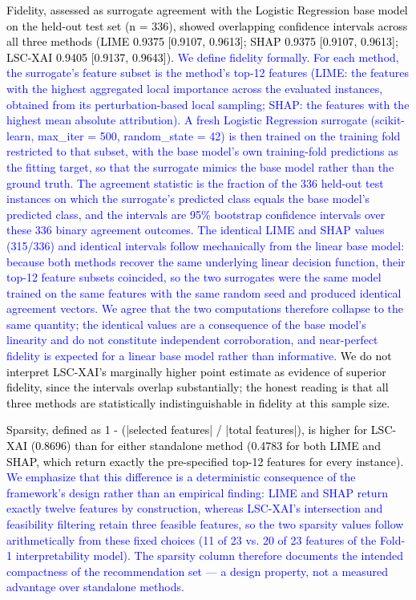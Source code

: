 \documentclass[a4paper,fleqn]{cas-sc}
\begin{document}
\textcolor{black}{Fidelity, assessed as surrogate agreement with the Logistic Regression base model on the held-out test set (n = 336), showed overlapping confidence intervals across all three methods (LIME 0.9375 [0.9107, 0.9613]; SHAP 0.9375 [0.9107, 0.9613]; LSC-XAI 0.9405 [0.9137, 0.9643]). \textcolor{blue}{We define fidelity formally. For each method, the surrogate's feature subset is the method's top-12 features (LIME: the features with the highest aggregated local importance across the evaluated instances, obtained from its perturbation-based local sampling; SHAP: the features with the highest mean absolute attribution). A fresh Logistic Regression surrogate (scikit-learn, max\_iter = 500, random\_state = 42) is then trained on the training fold restricted to that subset, with the base model's own training-fold predictions as the fitting target, so that the surrogate mimics the base model rather than the ground truth. The agreement statistic is the fraction of the 336 held-out test instances on which the surrogate's predicted class equals the base model's predicted class, and the intervals are 95\% bootstrap confidence intervals over these 336 binary agreement outcomes. The identical LIME and SHAP values (315/336) and identical intervals follow mechanically from the linear base model: because both methods recover the same underlying linear decision function, their top-12 feature subsets coincided, so the two surrogates were the same model trained on the same features with the same random seed and produced identical agreement vectors. We agree that the two computations therefore collapse to the same quantity; the identical values are a consequence of the base model's linearity and do not constitute independent corroboration, and near-perfect fidelity is expected for a linear base model rather than informative.} We do not interpret LSC-XAI's marginally higher point estimate as evidence of superior fidelity, since the intervals overlap substantially; the honest reading is that all three methods are statistically indistinguishable in fidelity at this sample size.}

\textcolor{black}{Sparsity, defined as 1 - (|selected features| / |total features|), is higher for LSC-XAI (0.8696) than for either standalone method (0.4783 for both LIME and SHAP, which return exactly the pre-specified top-12 features for every instance). \textcolor{blue}{We emphasize that this difference is a deterministic consequence of the framework's design rather than an empirical finding: LIME and SHAP return exactly twelve features by construction, whereas LSC-XAI's intersection and feasibility filtering retain three feasible features, so the two sparsity values follow arithmetically from these fixed choices (11 of 23 vs. 20 of 23 features of the Fold-1 interpretability model). The sparsity column therefore documents the intended compactness of the recommendation set — a design property, not a measured advantage over standalone methods.}}
\end{document}
